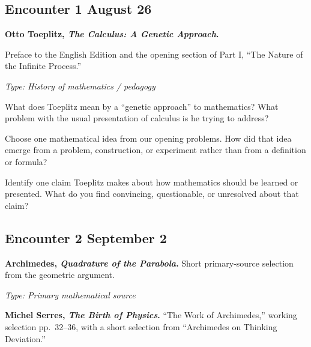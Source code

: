 \subsection*{Encounter 1 \hfill August 26}


\textbf{Otto Toeplitz, \emph{The Calculus: A Genetic Approach}.}

Preface to the English Edition and the opening section of
Part I, ``The Nature of the Infinite Process.''
\parencite{toeplitz1963}

\textit{Type: History of mathematics / pedagogy}

\begin{description}[leftmargin=1.15in,style=nextline]

\item[\textcolor{LangRed}{READ}]
What does Toeplitz mean by a ``genetic approach'' to mathematics?
What problem with the usual presentation of calculus is he trying
to address?

\item[\textcolor{LangRed}{CONNECT}]
Choose one mathematical idea from our opening problems.
How did that idea emerge from a problem, construction, or experiment
rather than from a definition or formula?

\item[\textcolor{LangRed}{QUESTION}]
Identify one claim Toeplitz makes about how mathematics should be
learned or presented. What do you find convincing, questionable,
or unresolved about that claim?

\end{description}

\subsection*{Encounter 2 \hfill September 2}

\textbf{Archimedes, \emph{Quadrature of the Parabola}.}
Short primary-source selection from the geometric argument.

\textit{Type: Primary mathematical source}

\medskip

\textbf{Michel Serres, \emph{The Birth of Physics}.}
``The Work of Archimedes,'' working selection pp.~32--36, with a short
selection from ``Archimedes on Thinking Deviation.''

